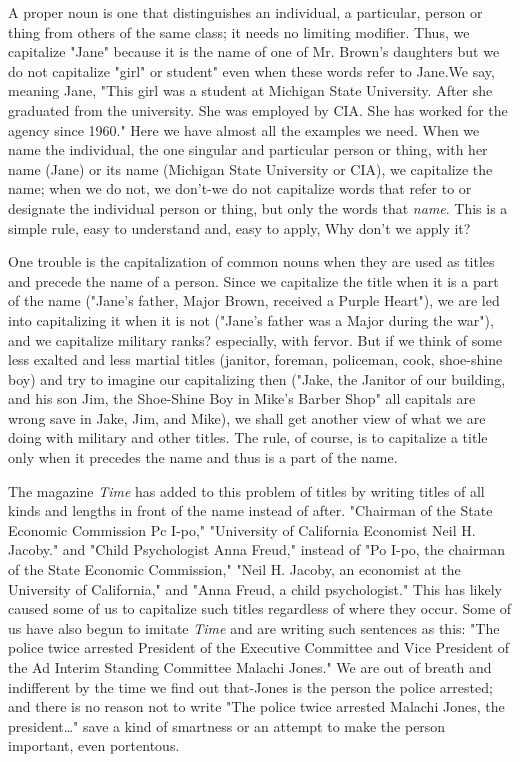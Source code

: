\documentclass[
    oneside,
    11pt,
    draft
]{memoir}
\begin{document}
A proper noun is one that distinguishes an individual, a particular, person or thing from others of the same class; it needs no limiting modifier. Thus, we capitalize "Jane" because it is the name of one of Mr. Brown's daughters but we do not capitalize "girl" or student" even when these words refer to Jane.We say, meaning Jane, "This girl was a student at Michigan State University. After she graduated from the university. She was employed by CIA. She has worked for the agency since 1960." Here we have almost all the examples we need. When we name the individual, the one singular and particular person or thing, with her name (Jane) or its name (Michigan State University or CIA), we capitalize the name; when we do not, we don't-we do not capitalize words that refer to or designate the individual person or thing, but only the words that \emph{name}. This is a simple rule, easy to understand and, easy to apply, Why don't we apply it? 

One trouble is the capitalization of common nouns when they are used as titles and precede the name of a person. Since we capitalize the title when it is a part of the name ("Jane's father, Major Brown, received a Purple Heart"), we are led into capitalizing it when it is not ("Jane's father was a Major during the war"), and we capitalize military ranks? especially, with fervor. But if we think of some less exalted and less martial titles (janitor, foreman, policeman, cook, shoe-shine boy) and try to imagine our capitalizing then ("Jake, the Janitor of our building, and his son Jim, the Shoe-Shine Boy in Mike's Barber Shop" all capitals are wrong save in Jake, Jim, and Mike), we shall get another view of what we are doing with military and other titles. The rule, of course, is to capitalize a title only when it precedes the name and thus is a part of the name. 

The magazine \emph{Time} has added to this problem of titles by writing titles of all kinds and lengths in front of the name instead of after. "Chairman of the State Economic Commission Pc I-po," "University of California Economist Neil H. Jacoby." and "Child Psychologist Anna Freud," instead of "Po I-po, the chairman of the State Economic Commission," "Neil H. Jacoby, an economist at the University of California," and "Anna Freud, a child psychologist." This has likely caused some of us to capitalize such titles regardless of where they occur. Some of us have also begun to imitate \emph{Time} and are writing such sentences as this: "The police twice arrested President of the Executive Committee and Vice President of the Ad Interim Standing Committee Malachi Jones." We are out of breath and indifferent by the time we find out that-Jones is the person the police arrested; and there is no reason not to write "The police twice arrested Malachi Jones, the president\dots" save a kind of smartness or an attempt to make the person important, even portentous.
\end{document}
